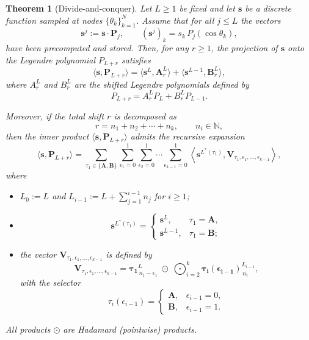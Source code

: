 \documentclass[11pt]{article}
\newtheorem{thm}{Theorem}[section]
\theoremstyle{definition}
\theoremstyle{remark}
\numberwithin{equation}{section}
\begin{document}
\begin{thm}[Divide-and-conquer]\label{thm:final_legendre_fft}
Let $L \ge 1$ be fixed and let $\mathbf{s}$ be a discrete function sampled at nodes
$\{\theta_k\}_{k=1}^N$.  
Assume that for all $j \le L$ the vectors
\[
\mathbf{s}^j := \mathbf{s} \cdot \mathbf{P}_j,
\qquad (\mathbf{s}^j)_k = s_k\, P_j(\cos\theta_k),
\]
have been precomputed and stored.  
Then, for any $r \ge 1$, the projection of $\mathbf{s}$ onto the Legendre polynomial
$P_{L+r}$ satisfies
\begin{equation}\label{eq:basic_projection}
\langle \mathbf{s}, \mathbf{P}_{L+r} \rangle
=
\langle \mathbf{s}^L, \mathbf{A}_r^L \rangle
+
\langle \mathbf{s}^{L-1}, \mathbf{B}_r^L \rangle,
\end{equation}
where $A_r^L$ and $B_r^L$ are the shifted Legendre polynomials defined by
\[
P_{L+r}
=
A_r^L P_L + B_r^L P_{L-1}.
\]

Moreover, if the total shift $r$ is decomposed as
\[
r = n_1 + n_2 + \cdots + n_k, \qquad n_i \in \mathbb{N},
\]
then the inner product $\langle \mathbf{s}, \mathbf{P}_{L+r} \rangle$ admits the
recursive expansion
\begin{equation}\label{eq:general_decomposition}
\langle \mathbf{s}, \mathbf{P}_{L+r} \rangle
=
\sum_{\tau_1 \in \{\mathbf{A},\mathbf{B}\}}
\sum_{\epsilon_1=0}^{1}
\sum_{\epsilon_2=0}^{1}
\cdots
\sum_{\epsilon_{k-1}=0}^{1}
\left\langle
\mathbf{s}^{L^*(\tau_1)},
\mathbf{V}_{\tau_1,\epsilon_1,\ldots,\epsilon_{k-1}}
\right\rangle,
\end{equation}
where
\begin{itemize}
\item $L_0 := L$ and $L_{i-1} := L + \sum_{j=1}^{i-1} n_j$ for $i \ge 1$;
\item
\[
\mathbf{s}^{L^*(\tau_1)} =
\begin{cases}
\mathbf{s}^L, & \tau_1 = \mathbf{A}, \\
\mathbf{s}^{L-1}, & \tau_1 = \mathbf{B};
\end{cases}
\]
\item the vector $\mathbf{V}_{\tau_1,\epsilon_1,\ldots,\epsilon_{k-1}}$ is defined by
\[
\mathbf{V}_{\tau_1,\epsilon_1,\ldots,\epsilon_{k-1}}
=
\mathbf{\tau_1}_{\,n_1-\epsilon_1}^{L}
\;\odot\;
\bigodot_{i=2}^{k}
\mathbf{\tau_i(\epsilon_{i-1})}_{\,n_i}^{L_{i-1}},
\]
with the selector
\[
\tau_i(\epsilon_{i-1}) =
\begin{cases}
\mathbf{A}, & \epsilon_{i-1}=0,\\
\mathbf{B}, & \epsilon_{i-1}=1.
\end{cases}
\]
\end{itemize}
All products $\odot$ are Hadamard (pointwise) products.
\end{thm}
\end{document}
